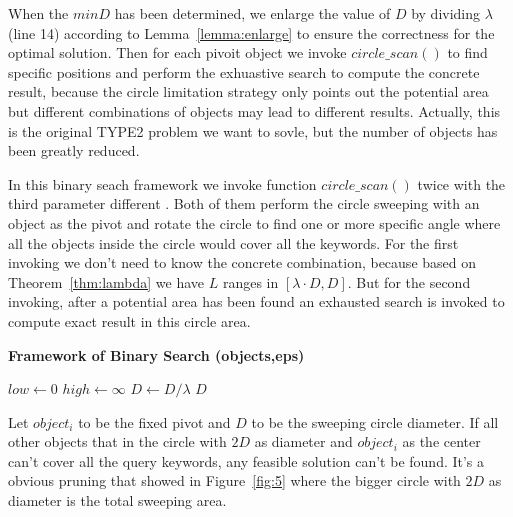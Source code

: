 \documentclass{sig-alternate}
\newcounter{example}[section]
\begin{document}
When the $minD$ has been determined, we enlarge the value of $D$ by dividing $\lambda$
(line 14) according to Lemma~\ref{lemma:enlarge} to ensure the correctness for the optimal
solution. Then for each pivoit object we invoke $circle\_scan()$ to find specific positions and perform
the exhuastive search to compute the concrete result, because the circle limitation strategy
only points out the potential area but different combinations of objects may lead to
different results. Actually, this is the original \textsf{TYPE2} problem we want to sovle, but
the number of objects has been greatly reduced.


In this binary seach framework
we invoke function $circle\_scan()$ twice with the third parameter different .
Both of them perform the circle sweeping with an object as the pivot and rotate the
circle to find one or more specific angle where all the objects inside the circle would
cover all the keywords. For the first invoking we don't need to
know the concrete combination, because based on Theorem~\ref{thm:lambda} we have
$L$ ranges in $[\lambda\cdot D, D]$.
But for the second invoking, after a potential area has been found
an exhausted search is invoked to compute exact result in this circle area.

\begin{algorithm}[!ht]\small\label{alg:binarysearch}
\caption{ \bf {Framework of Binary Search} (objects,eps)}

$low \gets 0$\;
$high \gets \infty$\;
$D \gets D/\lambda$\;
\Return $D$\;\vspace{-1ex}

\end{algorithm}

Let $object_i$ to be the fixed pivot and $D$ to be the sweeping circle diameter.
If all other objects that in the circle with $2D$ as diameter and $object_i$ as
the center can't cover all the query keywords, any feasible solution can't
be found. It's a obvious pruning that showed in Figure~\ref{fig:5} where the
bigger circle with $2D$ as diameter is the total sweeping area.
\end{document}
